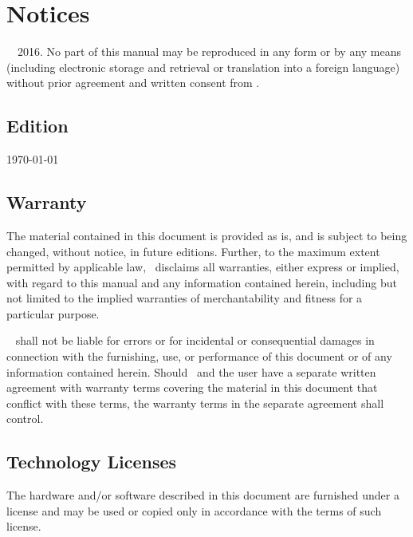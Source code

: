 
\section*{Notices}
\textcopyright~\docAuthor~2016.
No part of this manual may be reproduced in any form or by any means
(including electronic storage and retrieval or translation into a
foreign language) without prior agreement and written consent from \docAuthor.

\subsection*{Edition}
\today

\subsection*{Warranty}
The material contained in this document is provided \glqq as is\grqq, and is subject to
being changed, without notice, in future editions. Further, to the maximum extent
permitted by applicable law, \docAuthor~disclaims all warranties, either express or
implied, with regard to this manual and any information contained herein,
including but not limited to the implied warranties of merchantability and fitness
for a particular purpose.

\docAuthor~ shall not be liable for errors or for incidental
or consequential damages in connection with the furnishing, use, or performance of
this document or of any information contained herein. Should \docAuthor~and
the user have a separate written agreement with warranty terms covering the material
in this document that conflict with these terms, the warranty terms in the
separate agreement shall control.

\subsection*{Technology Licenses}
The hardware and/or software described in this document are furnished under a
license and may be used or copied only in accordance with the terms of such license.



